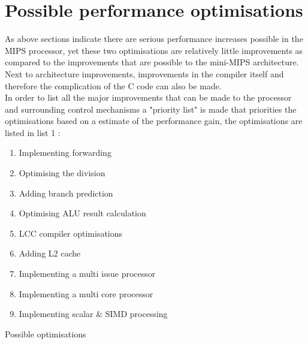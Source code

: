 \documentclass[10pt]{article}
\begin{document}
\section{Possible performance  optimisations }
As above sections indicate there are serious performance increases possible in the MIPS processor, yet these two optimisations are relatively little improvements as compared to the improvements that are possible to the mini-MIPS architecture.\\
Next to architecture improvements, improvements in the compiler itself and therefore the complication of the C code can also be made.\\ 
In order to list all the major improvements that can be made to the processor and surrounding control mechanisms a "priority list" is made that priorities the optimisations based on a estimate of the performance gain, the optimisations are listed in list 1 :
\begin{mylist}[H]

\begin{enumerate} \label{improvs}
  \item Implementing forwarding \label{forwarding}
  \item Optimising the division \label{divop}
  \item Adding branch prediction \label{branch}
  \item Optimising ALU result calculation \label{opindiv}
  \item LCC compiler optimisations \label{lcc}
  \item Adding L2 cache     \label{l2}
  \item Implementing a multi issue processor    \label{mulissie}
  \item Implementing a multi core processor \label{multicore}
  \item Implementing scalar \& SIMD processing \label{scalar}
\end{enumerate}
\caption{Possible optimisations }
\end{mylist}
\end{document}
